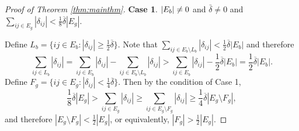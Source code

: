 \begin{proof}[Proof of Theorem \ref{thm:mainthm}]
\noindent\textbf{Case 1}. $|E_b| \neq 0$ and $\bar{\delta} \neq 0$ and $\sum_{ij\in E_{g}}|\delta_{ij}|<\frac{1}{8}\overline{\delta}|E_{g}|$. 
\medskip

Define $L_{b}=\{ij\in E_{b}:|\delta_{ij}|\ge\frac{1}{2}\overline{\delta}\}$.
Note that $\sum_{ij\in E_{b}\setminus L_{b}}|\delta_{ij}|<\frac{1}{2}\overline{\delta}|E_{b}|$
and therefore 
\begin{equation}
\sum_{ij\in L_{b}}|\delta_{ij}|=\sum_{ij\in E_{b}}|\delta_{ij}|-\sum_{ij\in E_{b}\setminus L_{b}}|\delta_{ij}|>\sum_{ij\in E_{b}}|\delta_{ij}|-\frac{1}{2}\overline{\delta}|E_{b}|=\frac{1}{2}\overline{\delta}|E_{b}|.\label{eq:large_delta-bipartite}
\end{equation}
Define $F_{g}=\{ij\in E_{g}:|\delta_{ij}|<\frac{1}{4}\overline{\delta}\}$.
Then by the condition of Case 1,
\[
\frac{1}{8}\overline{\delta}|E_{g}|>\sum_{ij\in E_{g}}|\delta_{ij}|\ge\sum_{ij\in E_{g}\setminus F_{g}}|\delta_{ij}|\ge\frac{1}{4}\overline{\delta}|E_{g}\setminus F_{g}|,
\]
and therefore $|E_{g}\setminus F_{g}|<\frac{1}{2}|E_{g}|$, or equivalently,
$|F_{g}|>\frac{1}{2}|E_{g}|$.


\end{proof}
